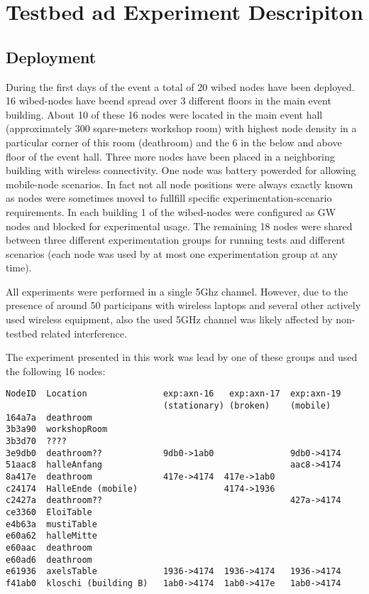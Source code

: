 \documentclass[a4paper,12pt,twoside]{article}
\begin{document}
\section{Testbed ad Experiment Descripiton}

\subsection{Deployment}

During the first days of the event a total of 20 wibed nodes have been
deployed. 16 wibed-nodes have beend spread over 3 different floors in
the main event building. About 10 of these 16 nodes were located in
the main event hall (approximately 300 sqare-meters workshop room)
with highest node density in a particular corner of this room
(deathroom) and the 6 in the below and above floor of the event
hall. Three more nodes have been placed in a neighboring building with
wireless connectivity.  One node was battery powerded for allowing
mobile-node scenarios.  In fact not all node positions were always
exactly known as nodes were sometimes moved to fullfill specific
experimentation-scenario requirements.  In each building 1 of the
wibed-nodes were configured as GW nodes and blocked for experimental
usage. The remaining 18 nodes were shared between three different
experimentation groups for running tests and different scenarios (each
node was used by at most one experimentation group at any time).

All experiments were performed in a single 5Ghz channel. However, due
to the presence of around 50 participans with wireless laptops and
several other actively used wireless equipment, also the used 5GHz
channel was likely affected by non-testbed related interference.

The experiment presented in this work was lead by one of these groups
and used the following 16 nodes:

\scriptsize
\begin{verbatim}
NodeID  Location               exp:axn-16   exp:axn-17  exp:axn-19
                               (stationary) (broken)    (mobile)
164a7a  deathroom
3b3a90  workshopRoom
3b3d70  ????
3e9db0  deathroom??            9db0->1ab0               9db0->4174
51aac8  halleAnfang                                     aac8->4174
8a417e  deathroom              417e->4174  417e->1ab0 
c24174  HalleEnde (mobile)                 4174->1936 
c2427a  deathroom??                                     427a->4174
ce3360  EloiTable
e4b63a  mustiTable
e60a62  halleMitte
e60aac  deathroom
e60ad6  deathroom
e61936  axelsTable             1936->4174  1936->4174   1936->4174
f41ab0  kloschi (building B)   1ab0->4174  1ab0->417e   1ab0->4174
\end{verbatim}
\normalsize
\end{document}
